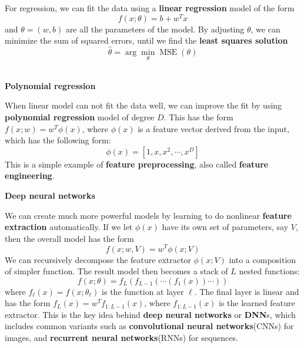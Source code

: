 \par
For  regression, we can fit the data using a \textbf{linear regression} model of the form
\begin{equation}
f(x;\theta) = b + w^Tx
\end{equation}
and $\theta=(w,b)$ are all the parameters of the model. By adjusting $\theta$, we can minimize the sum of squared errors, until we find the \textbf{least squares solution}
\begin{equation}
\hat{\theta} = \arg\min_{\theta}\operatorname{MSE}(\theta)
\end{equation}
~\\
\par
\noindent
\textbf{Polynomial regression}
\par
When linear model can not fit the data well, we can improve the fit by using \textbf{polynomial regression} model of degree $D$. This has the form $f(x;w) = w^T\phi(x)$, where $\phi(x)$ is a feature vector derived from the input, which has the following form:
\begin{equation}
\phi(x) = [1, x, x^2, \cdots, x^D]
\end{equation}
This is a simple example of \textbf{feature preprocessing}, also called \textbf{feature engineering}.
~\\
\par
\noindent
\textbf{Deep neural networks}
\par
We can create much more powerful models by learning to do nonlinear \textbf{feature extraction} automatically. If we let $\phi(x)$ have its own set of parameters, say $V$, then the overall model has the form
\begin{equation}
f(x;w,V) = w^T\phi(x;V)
\end{equation}
We can recursively decompose the feature extractor $\phi(x;V)$ into a composition of simpler function. The result model then becomes a stack of $L$ nested functions:
\begin{equation}
f(x;\theta) = f_L(f_{L-1}(\cdots(f_1(x))\cdots))
\end{equation}
where $f_{\ell}(x) = f(x;\theta_{\ell})$ is the function at layer $\ell$. The final layer is linear and has the form $f_L(x)=w^Tf_{1:L-1}(x)$, where $f_{1:L-1}(x)$ is the learned feature extractor. This is the key idea behind \textbf{deep neural networks} or \textbf{DNN}s, which includes common variants such as \textbf{convolutional neural networks}(CNNs) for images, and \textbf{recurrent neural networks}(RNNs) for sequences.
